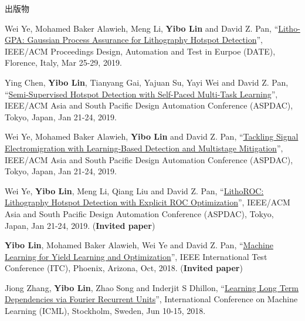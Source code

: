\begin{rSection}{出版物}
\begin{description}[font=\normalfont]
\item[{[C21]}]{
        Wei Ye, Mohamed Baker Alawieh, Meng Li, \textbf{Yibo Lin} and David Z. Pan, 
    ``\href{https://doi.org/10.23919/DATE.2019.8714960}{Litho-GPA: Gaussian Process Assurance for Lithography Hotspot Detection}'', 
    IEEE/ACM Proceedings Design, Automation and Test in Eurpoe (DATE), Florence, Italy, Mar 25-29, 2019.
    
}
            

\item[{[C20]}]{
        Ying Chen, \textbf{Yibo Lin}, Tianyang Gai, Yajuan Su, Yayi Wei and David Z. Pan, 
    ``\href{https://doi.org/10.1145/3287624.3287685}{Semi-Supervised Hotspot Detection with Self-Paced Multi-Task Learning}'', 
    IEEE/ACM Asia and South Pacific Design Automation Conference (ASPDAC), Tokyo, Japan, Jan 21-24, 2019.
    
}
            

\item[{[C19]}]{
        Wei Ye, Mohamed Baker Alawieh, \textbf{Yibo Lin} and David Z. Pan, 
    ``\href{https://doi.org/10.1145/3287624.3287688}{Tackling Signal Electromigration with Learning-Based Detection and Multistage Mitigation}'', 
    IEEE/ACM Asia and South Pacific Design Automation Conference (ASPDAC), Tokyo, Japan, Jan 21-24, 2019.
    
}
            

\item[{[C18]}]{
        Wei Ye, \textbf{Yibo Lin}, Meng Li, Qiang Liu and David Z. Pan, 
    ``\href{https://doi.org/10.1145/3287624.3288746}{LithoROC: Lithography Hotspot Detection with Explicit ROC Optimization}'', 
    IEEE/ACM Asia and South Pacific Design Automation Conference (ASPDAC), Tokyo, Japan, Jan 21-24, 2019.
    (\textbf{Invited paper})
}
            

\item[{[C17]}]{
        \textbf{Yibo Lin}, Mohamed Baker Alawieh, Wei Ye and David Z. Pan, 
    ``\href{https://doi.org/10.1109/TEST.2018.8624733}{Machine Learning for Yield Learning and Optimization}'', 
    IEEE International Test Conference (ITC), Phoenix, Arizona, Oct, 2018.
    (\textbf{Invited paper})
}
            

\item[{[C16]}]{
        Jiong Zhang, \textbf{Yibo Lin}, Zhao Song and Inderjit S Dhillon, 
    ``\href{https://arxiv.org/pdf/1803.06585.pdf}{Learning Long Term Dependencies via Fourier Recurrent Units}'', 
    International Conference on Machine Learning (ICML), Stockholm, Sweden, Jun 10-15, 2018.
    
}
\end{description}
\end{rSection}
